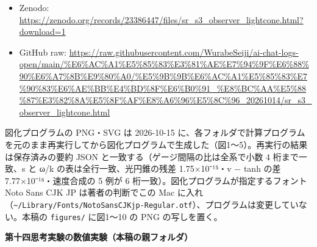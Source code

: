 \documentclass[
  a4paper,
]{ltjsarticle}
\providecommand{\tightlist}{%
  \setlength{\itemsep}{0pt}\setlength{\parskip}{0pt}}
\begin{document}
\begin{itemize}
  \begin{itemize}
  \tightlist
  \item
    Zenodo:
    \url{https://zenodo.org/records/23386447/files/sr_s3_observer_lightcone.html?download=1}
  \item
    GitHub raw:
    \url{https://raw.githubusercontent.com/WurabeSeiji/ai-chat-logs-open/main/\%E6\%AC\%A1\%E5\%85\%83\%E3\%81\%AE\%E7\%94\%9F\%E6\%88\%90\%E6\%A7\%8B\%E9\%80\%A0/\%E5\%9B\%9B\%E6\%AC\%A1\%E5\%85\%83\%E7\%90\%83\%E6\%AE\%BB\%E4\%BD\%8F\%E6\%B0\%91_\%E8\%BC\%AA\%E5\%88\%87\%E3\%82\%8A\%E5\%8F\%AF\%E8\%A6\%96\%E5\%8C\%96_20261014/sr_s3_observer_lightcone.html}
  \end{itemize}
\end{itemize}

図化プログラムの PNG・SVG は 2026-10-15
に、各フォルダで計算プログラムを元のまま再実行してから図化プログラムで生成した（図1〜5）。再実行の結果は保存済みの要約
JSON と一致する（ゲージ間隔の比は全系で小数 4 桁まで一致、s と ω/k
の表は全行一致、光円錐の残差 1.75×10⁻¹⁵・v − tanh の差
7.77×10⁻¹⁶・速度合成の 5 例が 6
桁一致）。図化プログラムが指定するフォント Noto Sans CJK JP
は著者の判断でこの Mac
に入れ（\texttt{\textasciitilde{}/Library/Fonts/NotoSansCJKjp-Regular.otf}）、プログラムは変更していない。本稿の
\texttt{figures/\allowbreak{}} に図1〜10 の PNG の写しを置く。

\textbf{第十四思考実験の数値実験（本稿の親フォルダ）}
\end{document}
